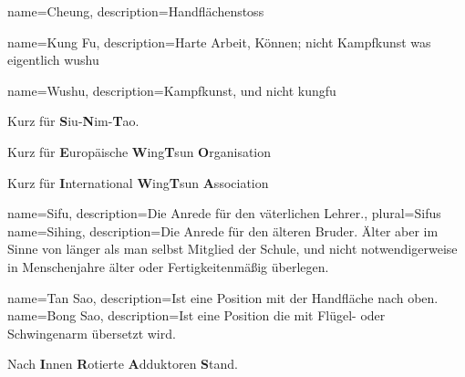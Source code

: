






{
  name=Cheung,
  description={Handfl\"achenstoss}
}

{
  name=Kung Fu,
  description={Harte Arbeit, K\"onnen; nicht Kampfkunst was eigentlich wushu}
}



{
  name=Wushu,
  description={Kampfkunst, und nicht kungfu}
}


	{Kurz f\"ur \textbf{S}iu-\textbf{N}im-\textbf{T}ao.}

	{Kurz f\"ur \textbf{E}urop\"aische \textbf{W}ing\textbf{T}sun \textbf{O}rganisation}

	{Kurz f\"ur \textbf{I}nternational \textbf{W}ing\textbf{T}sun \textbf{A}ssociation}




{
  name=Sifu,
  description={Die Anrede f\"ur den v\"aterlichen Lehrer.},
  plural=Sifus
}
{
  name=Sihing,
  description={Die Anrede f\"ur den \"alteren Bruder. \"Alter aber im Sinne von l\"anger als man selbst Mitglied der Schule, und nicht notwendigerweise in Menschenjahre \"alter oder Fertigkeitenm\"a{\ss}ig \"uberlegen.}
}


{
  name=Tan Sao,
  description={Ist eine Position mit der Handfl\"ache nach oben.}
}
{
  name=Bong Sao,
  description={Ist eine Position die mit Fl\"ugel- oder Schwingenarm \"ubersetzt wird.}
}

	{Nach \textbf{I}nnen \textbf{R}otierte \textbf{A}dduktoren \textbf{S}tand.}